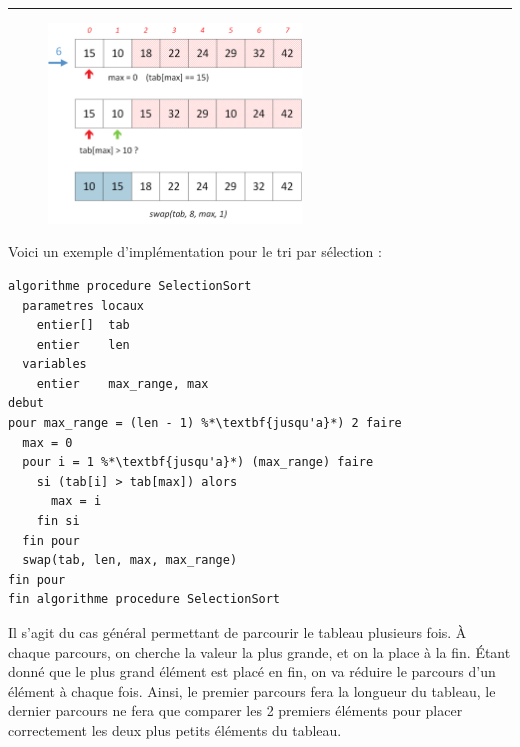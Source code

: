 \documentclass[11pt,a4paper]{article}
\begin{document}
\vfillFirst

\par\rule{\textwidth}{0.5pt} 

\vfillLast

\begin{figure}[ht!]
\centering
\centerline{
\includegraphics[width=0.6\textwidth]{img/tris/2_per_pages/SelectionSort_part4.png}
}
\end{figure}


\clearpage

Voici un exemple d'implémentation pour le tri par sélection :

\bigskip

\begin{table}[ht!]
  \centering
\begin{lstlisting}[style=algorithmique]
algorithme procedure SelectionSort
  parametres locaux
    entier[]  tab
    entier    len
  variables
    entier    max_range, max
debut
pour max_range = (len - 1) %*\textbf{jusqu'a}*) 2 faire
  max = 0
  pour i = 1 %*\textbf{jusqu'a}*) (max_range) faire
    si (tab[i] > tab[max]) alors
      max = i
    fin si
  fin pour
  swap(tab, len, max, max_range)
fin pour
fin algorithme procedure SelectionSort \end{lstlisting}
\end{table}

Il s'agit du cas général permettant de parcourir le tableau plusieurs fois.
\`A chaque parcours, on cherche la valeur la plus grande, et on la place à la fin.
\'Etant donné que le plus grand élément est placé en fin, on va réduire le parcours d'un élément à chaque fois.
Ainsi, le premier parcours fera la longueur du tableau, le dernier parcours ne fera que comparer les 2 premiers éléments pour placer correctement les deux plus petits éléments du tableau.
\end{document}
